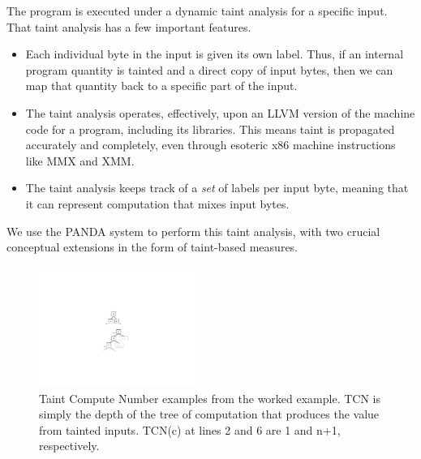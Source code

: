 The program is executed under a dynamic taint analysis for a specific input.
That taint analysis has a few important features.
\begin{itemize}
\item Each individual byte in the input is given its own label.
Thus, if an internal program quantity is tainted and a direct copy of input bytes, then we can map that quantity back to a specific part of the input.  
\item The taint analysis operates, effectively, upon an LLVM version of the machine code for a program, including its libraries.
This means taint is propagated accurately and completely, even through esoteric x86 machine instructions like MMX and XMM.
\item The taint analysis keeps track of a \emph{set} of labels per input byte, meaning that it can represent computation that mixes input bytes.
\end{itemize}
We use the PANDA system to perform this taint analysis, with two crucial conceptual extensions in the form of taint-based measures.


\begin{figure}
\centering
\includegraphics[width=2in]{tcn.pdf}
\caption{Taint Compute Number examples from the worked example.  
TCN is simply the depth of the tree of computation that produces the value from tainted inputs.
TCN(c) at lines 2 and 6 are 1 and n+1, respectively.}
\label{fig:taint-compute-number}
\end{figure}

